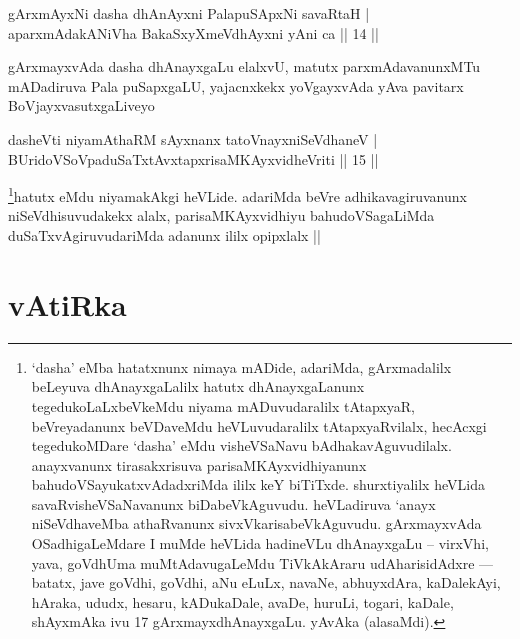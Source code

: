 
\begin{shl}
gArxmAyxNi dasha dhAnAyxni PalapuSApxNi savaRtaH | \\
aparxmAdakANiVha BakaSxyXmeVdhAyxni yAni ca \hfill|| 14 || 
\end{shl}

\begin{artha}
gArxmayxvAda dasha dhAnayxgaLu elalxvU, matutx parxmAdavanunxMTu mADadiruva Pala puSapxgaLU, yajacnxkekx yoVgayxvAda yAva pavitarx BoVjayxvasutxgaLiveyo 
\end{artha}


\begin{shl}
dasheVti niyamAthaRM sAyxnanx tatoV\s nayxniSeVdhaneV | \\
BUridoVSoVpaduSaTxtAvxtapxrisaMKAyxvidheVriti \hfill|| 15 || 
\end{shl}

\begin{artha}
\footnote{`dasha' eMba hatatxnunx nimaya mADide, adariMda, gArxmadalilx beLeyuva dhAnayxgaLalilx hatutx dhAnayxgaLanunx tegedukoLaLxbeVkeMdu niyama mADuvudaralilx tAtapxyaR, beVreyadanunx beVDaveMdu heVLuvudaralilx tAtapxyaRvilalx, hecAcxgi tegedukoMDare `dasha' eMdu visheVSaNavu bAdhakavAguvudilalx. anayxvanunx tirasakxrisuva parisaMKAyxvidhiyanunx bahudoVSayukatxvAdadxriMda ililx keY biTiTxde. shurxtiyalilx heVLida savaRvisheVSaNavanunx biDabeVkAguvudu. heVLadiruva `anayx niSeVdhaveMba athaRvanunx sivxVkarisabeVkAguvudu. gArxmayxvAda OSadhigaLeMdare I muMde heVLida hadineVLu dhAnayxgaLu -- virxVhi, yava, goVdhUma muMtAdavugaLeMdu TiVkAkAraru udAharisidAdxre --- \stext batatx, jave goVdhi, goVdhi, aNu eLuLx, navaNe, abhuyxdAra, kaDalekAyi, hAraka, ududx, hesaru, kADukaDale, avaDe, huruLi, togari, kaDale, shAyxmAka ivu 17 gArxmayxdhAnayxgaLu. yAvAka (alasaMdi).}hatutx eMdu niyamakAkgi heVLide. adariMda beVre adhikavagiruvanunx niSeVdhisuvudakekx alalx, parisaMKAyxvidhiyu bahudoVSagaLiMda duSaTxvAgiruvudariMda adanunx ililx opipxlalx ||
\end{artha}

\section*{vAtiRka}


